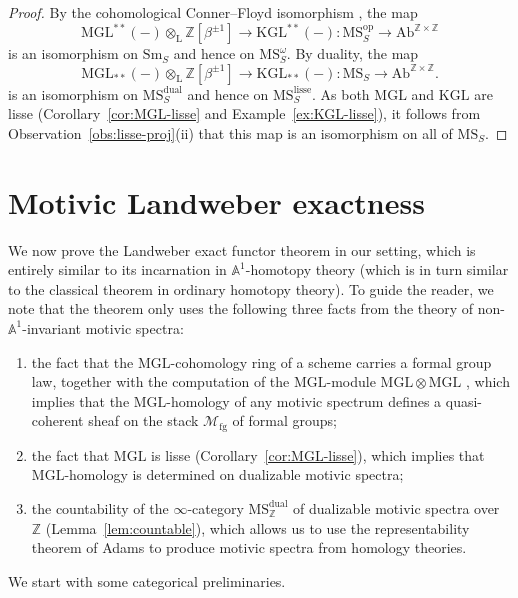 \documentclass{amsart}
\numberwithin{equation}{section}
\theoremstyle{plain}
\theoremstyle{definition}
\let\scr=\mathcal
\let\bb=\mathbb
\def\Z{\bb Z}
\def\A{\bb A}
\def\ph{\mathord-}
\def\L{\mathrm{L}{}}
\let\cat=\mathrm
\def\MGL{\mathrm{MGL}}
\def\KGL{\mathrm{KGL}}
\def\Sm{{\cat{S}\mathrm{m}}}
\def\op{\mathrm{op}}
\def\MS{\mathrm{MS}}
\def\Ab{\mathrm{A}\mathrm{b}}
\def\fg{\mathrm{fg}}
\def\lisse{\mathrm{lisse}}
\def\dual{\mathrm{dual}}
\begin{document}
\begin{proof}
	By the cohomological Conner–Floyd isomorphism \cite[Theorem~8.11]{AHI}, the map
	\[
	\MGL^{**}(\ph)\otimes_\L\Z[\beta^{\pm 1}] \to \KGL^{**}(\ph)\colon \MS_S^\op\to \Ab^{\Z\times\Z}
	\]
	is an isomorphism on $\Sm_S$ and hence on $\MS_S^\omega$. By duality, the map
	\[
	\MGL_{**}(\ph)\otimes_\L\Z[\beta^{\pm 1}]\to \KGL_{**}(\ph) \colon \MS_S\to \Ab^{\Z\times\Z}.
	\]
	is an isomorphism on $\MS_S^\dual$ and hence on $\MS_S^\lisse$. As both $\MGL$ and $\KGL$ are lisse (Corollary~\ref{cor:MGL-lisse} and Example~\ref{ex:KGL-lisse}), it follows from Observation~\ref{obs:lisse-proj}(ii) that this map is an isomorphism on all of $\MS_S$.
\end{proof}

\section{Motivic Landweber exactness}
\label{sec:LEFT}


We now prove the Landweber exact functor theorem in our setting, which is entirely similar to its incarnation in $\A^1$-homotopy theory \cite{Naumann:2009} (which is in turn similar to the classical theorem in ordinary homotopy theory).
To guide the reader, we note that the theorem only uses the following three facts from the theory of non-$\A^1$-invariant motivic spectra:
\begin{enumerate}
	\item the fact that the $\MGL$-cohomology ring of a scheme carries a formal group law, together with the computation of the $\MGL$-module $\MGL\otimes\MGL$ \cite[Proposition 7.9]{AHI}, which implies that the $\MGL$-homology of any motivic spectrum defines a quasi-coherent sheaf on the stack $\scr M_\fg$ of formal groups;
	\item the fact that $\MGL$ is lisse (Corollary~\ref{cor:MGL-lisse}), which implies that $\MGL$-homology is determined on dualizable motivic spectra;
	\item the countability of the $\infty$-category $\MS_\Z^\mathrm{dual}$ of dualizable motivic spectra over $\Z$ (Lemma~\ref{lem:countable}), which allows us to use the representability theorem of Adams to produce motivic spectra from homology theories.
\end{enumerate}

We start with some categorical preliminaries.
\end{document}
